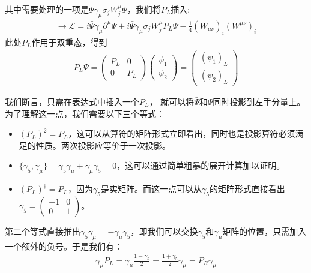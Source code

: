 其中需要处理的一项是$\bar{\Psi}\gamma_\mu\sigma_j W^\mu_j\Psi$，我们将$P_L$插入:
\begin{align}
\rightarrow\mathscr{L}=i\bar{\Psi}\gamma_\mu\partial^\mu\Psi+i\bar{\Psi}\gamma_\mu\sigma_j W_j^\mu P_L\Psi-\frac{1}{4}(W_{\mu\nu})_i(W^{\mu\nu})_i
\label{equ7.105}
\end{align}
此处$P_L$作用于双重态，得到
\begin{align}
P_L\Psi=\begin{pmatrix}P_L & 0 \\ 0 & P_L\end{pmatrix}\begin{pmatrix}\psi_1\\\psi_2\end{pmatrix}=\begin{pmatrix}(\psi_1)_L\\(\psi_2)_L\end{pmatrix}
\label{equ7.106}
\end{align}

我们断言，只需在表达式中插入一个$P_L$， 就可以将$\bar{\Psi}$和$\Psi$同时投影到左手分量上。为了理解这一点，我们需要以下三个等式：
\begin{itemize}
\item $(P_L)^2 = P_L$，这可以从算符的矩阵形式立即看出，同时也是投影算符必须满足的性质。两次投影应等价于一次投影。
\item $\{\gamma_5,\gamma_\mu\}=\gamma_5\gamma_\mu+\gamma_\mu\gamma_5=0$，这可以通过简单粗暴的展开计算加以证明。
\item $(P_L)^\dag=P_L$，因为$\gamma_5$是实矩阵。而这一点可以从$\gamma_5$的矩阵形式直接看出$\gamma_5=\begin{pmatrix}-1 & 0 \\ 0 & 1\end{pmatrix}$。

\end{itemize}

第二个等式直接推出$\gamma_5\gamma_\mu=-\gamma_\mu\gamma_5$，即我们可以交换$\gamma_5$和$\gamma_\mu$矩阵的位置，只需加入一个额外的负号。于是我们有：
\begin{align}
\gamma_\mu P_L=\gamma_\mu\frac{1-\gamma_5}{2}=\frac{1+\gamma_5}{2}\gamma_\mu=P_R\gamma_\mu
\label{equ7.107}
\end{align}

